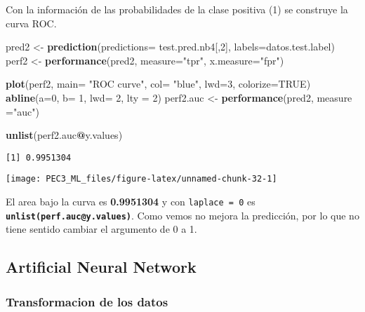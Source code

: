 \documentclass[
]{article}
\newenvironment{Shaded}{\begin{snugshade}}{\end{snugshade}}
\newcommand{\DataTypeTok}[1]{\textcolor[rgb]{0.13,0.29,0.53}{#1}}
\newcommand{\DecValTok}[1]{\textcolor[rgb]{0.00,0.00,0.81}{#1}}
\newcommand{\KeywordTok}[1]{\textcolor[rgb]{0.13,0.29,0.53}{\textbf{#1}}}
\newcommand{\NormalTok}[1]{#1}
\newcommand{\OperatorTok}[1]{\textcolor[rgb]{0.81,0.36,0.00}{\textbf{#1}}}
\newcommand{\OtherTok}[1]{\textcolor[rgb]{0.56,0.35,0.01}{#1}}
\newcommand{\StringTok}[1]{\textcolor[rgb]{0.31,0.60,0.02}{#1}}
\begin{document}
Con la información de las probabilidades de la clase positiva (1) se
construye la curva ROC.

\begin{Shaded}
\begin{Highlighting}[]
\NormalTok{pred2 <-}\StringTok{ }\KeywordTok{prediction}\NormalTok{(}\DataTypeTok{predictions=}\NormalTok{ test.pred.nb4[,}\DecValTok{2}\NormalTok{], }\DataTypeTok{labels=}\NormalTok{datos.test.label)}
\NormalTok{perf2 <-}\StringTok{ }\KeywordTok{performance}\NormalTok{(pred2, }\DataTypeTok{measure=}\StringTok{"tpr"}\NormalTok{, }\DataTypeTok{x.measure=}\StringTok{"fpr"}\NormalTok{)}

\KeywordTok{plot}\NormalTok{(perf2, }\DataTypeTok{main=} \StringTok{"ROC curve"}\NormalTok{, }\DataTypeTok{col=} \StringTok{"blue"}\NormalTok{, }\DataTypeTok{lwd=}\DecValTok{3}\NormalTok{, }\DataTypeTok{colorize=}\OtherTok{TRUE}\NormalTok{)}
\KeywordTok{abline}\NormalTok{(}\DataTypeTok{a=}\DecValTok{0}\NormalTok{, }\DataTypeTok{b=} \DecValTok{1}\NormalTok{, }\DataTypeTok{lwd=} \DecValTok{2}\NormalTok{, }\DataTypeTok{lty =} \DecValTok{2}\NormalTok{)}
\NormalTok{perf2.auc <-}\StringTok{ }\KeywordTok{performance}\NormalTok{(pred2, }\DataTypeTok{measure =}\StringTok{"auc"}\NormalTok{)}

\KeywordTok{unlist}\NormalTok{(perf2.auc}\OperatorTok{@}\NormalTok{y.values)}
\end{Highlighting}
\end{Shaded}

\begin{verbatim}
[1] 0.9951304
\end{verbatim}

\begin{center}\texttt{[image: PEC3\_ML\_files/figure-latex/unnamed-chunk-32-1]} \end{center}

El area bajo la curva es \textbf{0.9951304} y con \texttt{laplace\ =\ 0}
es \textbf{\texttt{unlist(perf.auc@y.values)}}. Como vemos no mejora la
predicción, por lo que no tiene sentido cambiar el argumento de 0 a 1.

\hypertarget{artificial-neural-network}{%
\subsection{Artificial Neural Network}\label{artificial-neural-network}}

\hypertarget{transformacion-de-los-datos}{%
\subsubsection{Transformacion de los
datos}\label{transformacion-de-los-datos}}
\end{document}
